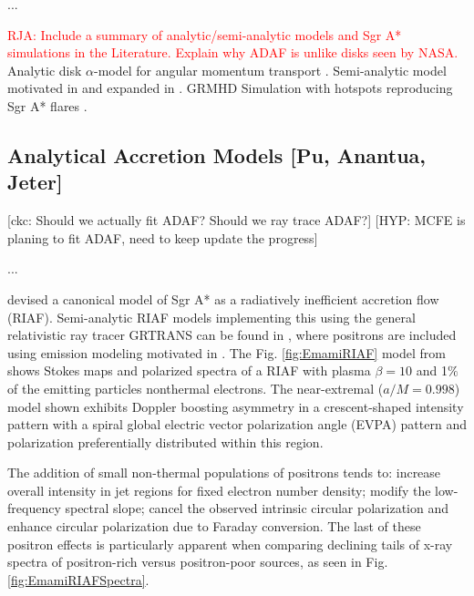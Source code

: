 \documentclass[twocolumn,tighten,dvipsnames,linenumbers]{aastex63}
\newcommand\ckc[1]{{\color{MidnightBlue}[ckc: #1]}}
\newcommand\hyp[1]{{\color{Salmon}[HYP: #1]}}
\begin{document}
...


\textcolor{red}{RJA: Include a summary of analytic/semi-analytic models and Sgr A* simulations in the Literature. Explain why ADAF is unlike disks seen by NASA.} Analytic disk $\alpha$-model for angular momentum transport \cite{Shakura1973}. Semi-analytic model motivated in \cite{Yuan2003} and expanded in \cite{Broderick2011}. GRMHD Simulation with hotspots reproducing Sgr A* flares \cite{Ripperda2020}.

\subsection{Analytical Accretion Models
  [Pu, Anantua, Jeter]}
\label{sec:anamodels}



\ckc{Should we actually fit ADAF?
  Should we ray trace ADAF?}
\hyp{MCFE is planing to fit ADAF, need to keep update the progress}

...

\cite{Broderick2005} devised a canonical model of Sgr A* as a  radiatively inefficient accretion flow (RIAF). Semi-analytic RIAF models implementing  this using the general relativistic ray tracer GRTRANS \citep{2016MNRAS.462..115D} can be found in  \cite{Emami2021}, where  positrons are included using emission modeling motivated in  \cite{Anantua:2019bna}. The Fig. \ref{fig:EmamiRIAF} model from \cite{Emami2021}  shows Stokes maps and polarized spectra of a \cite{Broderick2005} RIAF with plasma $\beta=10$ and 1$\%$ of the emitting particles nonthermal electrons. The near-extremal ($a/M=0.998$) model shown exhibits Doppler boosting asymmetry in a crescent-shaped intensity pattern with a spiral global electric vector polarization angle (EVPA) pattern and polarization preferentially distributed within this region.


The addition of small non-thermal populations of positrons \citep{Anantua:2019bna,Emami2021} tends to: increase overall intensity in jet regions for fixed electron number density; modify the low-frequency spectral slope; cancel the observed intrinsic circular polarization and enhance circular polarization due to Faraday conversion. The last of these positron effects is particularly apparent when comparing declining tails of x-ray spectra of positron-rich versus positron-poor sources, as seen in Fig. \ref{fig:EmamiRIAFSpectra}.
\end{document}
